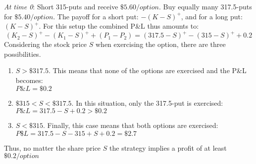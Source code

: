 \documentclass{article}
\begin{document}
\textit{At time 0}: Short 315-puts and receive $\$5.60 / option$. Buy equally many 317.5-puts for $\$5.40/option$.
The payoff for a short put: $-(K-S)^+$, and for a long put: $(K-S)^+$. For this setup the combined P\&L thus amounts to:
$$(K_2-S)^+ -(K_1-S)^+ + (P_1 - P_2) = (317.5-S)^+ - (315-S)^+ + 0.2$$
Considering the stock price $S$ when exercising the option, there are three possibilities.
\begin{enumerate}
	\item $S > \$317.5$. This means that none of the options are exercised and the P\&L becomes: \\ $P\&L = \$0.2$
	\item $\$315 < S < \$317.5$. In this situation, only the 317.5-put is exercised: \\ $P\&L = 317.5 - S + 0.2 > \$0.2$
	\item $S < \$315$. Finally, this case means that both options are exercised: \\$P\$L = 317.5 - S - 315 + S + 0.2 = \$2.7$
\end{enumerate}
Thus, no matter the share price $S$ the strategy implies a profit of at least $\$0.2/option$
\end{document}
